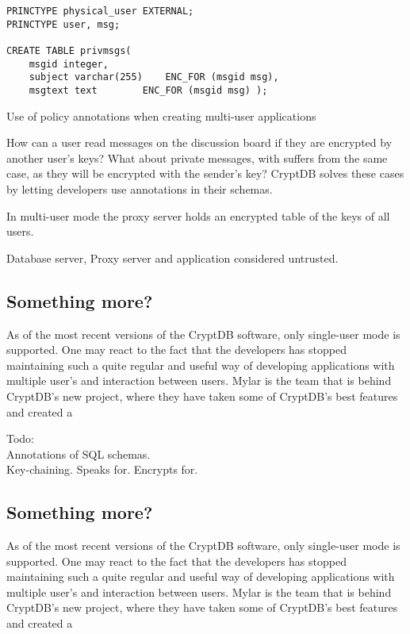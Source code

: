 \begin{table}
\begin{Verbatim}[frame=single]
PRINCTYPE physical_user EXTERNAL;
PRINCTYPE user, msg;

CREATE TABLE privmsgs(
	msgid integer,
	subject varchar(255)	ENC_FOR (msgid msg),
	msgtext text		ENC_FOR (msgid msg) );
\end{Verbatim}
\caption{Use of policy annotations when creating multi-user applications}
\label{annotations}
\end{table}


How can a user read messages on the discussion board if they are encrypted by another user's keys? What about private messages, with suffers from the same case, as they will be encrypted with the sender's key? CryptDB solves these cases by letting developers use annotations in their schemas. 

In multi-user mode the proxy server holds an encrypted table of the keys of all users.

Database server, Proxy server and application considered untrusted. 

\subsection{Something more?}

As of the most recent versions of the CryptDB software, only single-user mode is supported. One may react to the fact that the developers has stopped maintaining such a quite regular and useful way of developing applications with multiple user's and interaction between users. Mylar \cite{mylar_homepage} is the team that is behind CryptDB's new project, where they have taken some of CryptDB's best features and created a 

Todo:\\
Annotations of SQL schemas.\\
Key-chaining. Speaks for. Encrypts for.\\

\subsection{Something more?}

As of the most recent versions of the CryptDB software, only single-user mode is supported. One may react to the fact that the developers has stopped maintaining such a quite regular and useful way of developing applications with multiple user's and interaction between users. Mylar \cite{mylar_homepage} is the team that is behind CryptDB's new project, where they have taken some of CryptDB's best features and created a 

